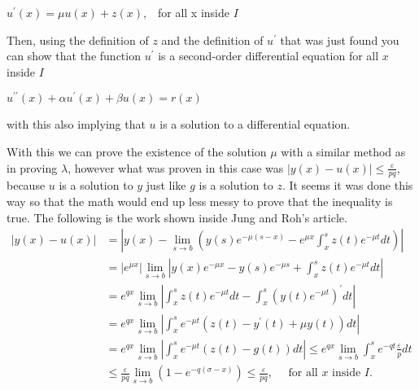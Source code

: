 \documentclass[mla9]{mla}
\begin{document}
\begin{paper}
\begin{center}
    $u^\prime (x)= \mu u(x) + z(x)$,\ \ for all x inside $I$
\end{center}
 
Then, using the definition of $z$ and the definition of $u^\prime$ that was just found you can show that the function $u^\prime$ is a second-order differential equation for all $x$ inside $I$

\begin{center}
    $u^{\prime \prime}(x)+\alpha u^{\prime}(x)+\beta u(x)=r(x)$
\end{center}
with this also implying that $u$ is a solution to a differential equation.

With this we can prove the existence of the solution $\mu$ with a similar method as in proving $\lambda$, however what was proven in this case was $|y(x) - u(x)| \leq \frac{\varepsilon}{p q}$, because $u$ is a solution to $y$ just like $g$ is a solution to $z$. It seems it was done this way so that the math would end up less messy to prove that the inequality is true. The following is the work shown inside Jung and Roh's article.
\[\begin{aligned}
    |y(x)-u(x)| & =\left|y(x)-\lim _{s \rightarrow b}\left(y(s) e^{-\mu(s-x)}-e^{\mu x} \int_x^s z(t) e^{-\mu t} d t\right)\right| \\
    & =\left|e^{\mu x}\right| \lim _{s \rightarrow b}\left|y(x) e^{-\mu x}-y(s) e^{-\mu s}+\int_x^s z(t) e^{-\mu t} d t\right| \\
    & =e^{q x} \lim _{s \rightarrow b}\left|\int_x^s z(t) e^{-\mu t} d t-\int_x^s\left(y(t) e^{-\mu t}\right)^{\prime} d t\right| \\
    & =e^{q x} \lim _{s \rightarrow b}\left|\int_x^s e^{-\mu t}\left(z(t)-y^{\prime}(t)+\mu y(t)\right) d t\right| \\
    & =e^{q x} \lim _{s \rightarrow b}\left|\int_x^s e^{-\mu t}(z(t)-g(t)) d t\right| \leq e^{q x} \lim _{s \rightarrow b} \int_x^s e^{-q t} \frac{\varepsilon}{p} d t \\
    & \leq \frac{\varepsilon}{p q} \lim _{s \rightarrow b}\left(1-e^{-q(\sigma-x)}\right) \leq \frac{\varepsilon}{p q}, \quad \text { for all } x \text{ inside } I.
\end{aligned}\]


\end{paper}
\end{document}
